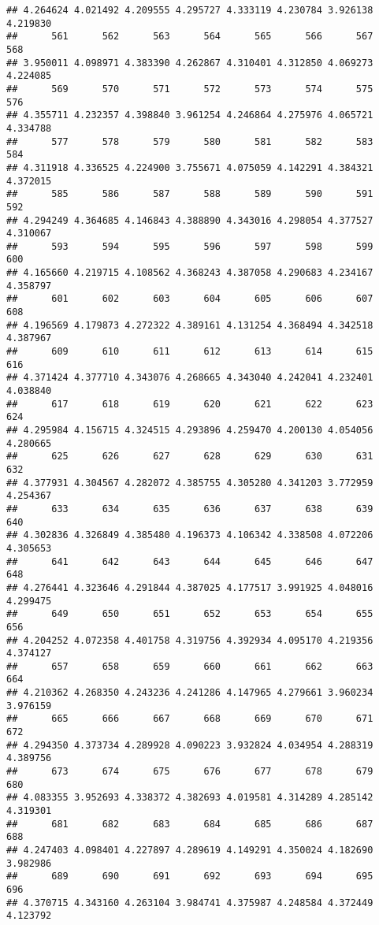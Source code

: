 \documentclass[
]{article}
\begin{document}
\begin{verbatim}
## 4.264624 4.021492 4.209555 4.295727 4.333119 4.230784 3.926138 4.219830 
##      561      562      563      564      565      566      567      568 
## 3.950011 4.098971 4.383390 4.262867 4.310401 4.312850 4.069273 4.224085 
##      569      570      571      572      573      574      575      576 
## 4.355711 4.232357 4.398840 3.961254 4.246864 4.275976 4.065721 4.334788 
##      577      578      579      580      581      582      583      584 
## 4.311918 4.336525 4.224900 3.755671 4.075059 4.142291 4.384321 4.372015 
##      585      586      587      588      589      590      591      592 
## 4.294249 4.364685 4.146843 4.388890 4.343016 4.298054 4.377527 4.310067 
##      593      594      595      596      597      598      599      600 
## 4.165660 4.219715 4.108562 4.368243 4.387058 4.290683 4.234167 4.358797 
##      601      602      603      604      605      606      607      608 
## 4.196569 4.179873 4.272322 4.389161 4.131254 4.368494 4.342518 4.387967 
##      609      610      611      612      613      614      615      616 
## 4.371424 4.377710 4.343076 4.268665 4.343040 4.242041 4.232401 4.038840 
##      617      618      619      620      621      622      623      624 
## 4.295984 4.156715 4.324515 4.293896 4.259470 4.200130 4.054056 4.280665 
##      625      626      627      628      629      630      631      632 
## 4.377931 4.304567 4.282072 4.385755 4.305280 4.341203 3.772959 4.254367 
##      633      634      635      636      637      638      639      640 
## 4.302836 4.326849 4.385480 4.196373 4.106342 4.338508 4.072206 4.305653 
##      641      642      643      644      645      646      647      648 
## 4.276441 4.323646 4.291844 4.387025 4.177517 3.991925 4.048016 4.299475 
##      649      650      651      652      653      654      655      656 
## 4.204252 4.072358 4.401758 4.319756 4.392934 4.095170 4.219356 4.374127 
##      657      658      659      660      661      662      663      664 
## 4.210362 4.268350 4.243236 4.241286 4.147965 4.279661 3.960234 3.976159 
##      665      666      667      668      669      670      671      672 
## 4.294350 4.373734 4.289928 4.090223 3.932824 4.034954 4.288319 4.389756 
##      673      674      675      676      677      678      679      680 
## 4.083355 3.952693 4.338372 4.382693 4.019581 4.314289 4.285142 4.319301 
##      681      682      683      684      685      686      687      688 
## 4.247403 4.098401 4.227897 4.289619 4.149291 4.350024 4.182690 3.982986 
##      689      690      691      692      693      694      695      696 
## 4.370715 4.343160 4.263104 3.984741 4.375987 4.248584 4.372449 4.123792 

\end{verbatim}
\end{document}
